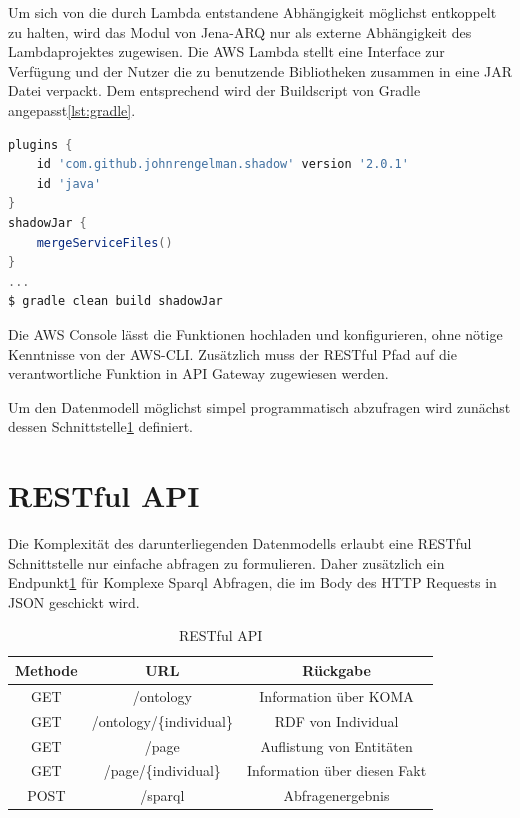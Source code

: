 \documentclass[
12pt,
english,
ngerman,
headsepline,
twoside,
openright,
numbers=noenddot,version=first
]{scrreprt}
\providecommand{\tabularnewline}{\\}
\begin{document}
Um sich von die durch Lambda entstandene Abhängigkeit möglichst entkoppelt\cite{FlowerRefactoring} zu halten, wird das Modul von Jena-ARQ nur als externe Abhängigkeit des Lambdaprojektes zugewisen.
Die AWS Lambda stellt eine Interface zur Verfügung und der Nutzer die zu benutzende Bibliotheken zusammen in eine JAR Datei verpackt. Dem entsprechend wird der Buildscript von Gradle\cite{Muschko2014} angepasst\ref{lst:gradle}. 

\begin{lstlisting}[language=Groovy,caption={Abhängigkeitenverwaltung für Lambda in Java},label={lst:gradle}]
plugins {
	id 'com.github.johnrengelman.shadow' version '2.0.1'
	id 'java'
}
shadowJar {
	mergeServiceFiles()
}
...
$ gradle clean build shadowJar
\end{lstlisting}

Die AWS Console lässt die Funktionen hochladen und konfigurieren, ohne nötige Kenntnisse von der AWS-CLI. Zusätzlich muss der RESTful Pfad auf die verantwortliche Funktion in API Gateway zugewiesen werden. 


Um den Datenmodell möglichst simpel programmatisch abzufragen wird zunächst dessen Schnittstelle\ref{sec:rest} definiert. 

\section{RESTful API}
\label{sec:rest}

Die Komplexität des darunterliegenden Datenmodells erlaubt eine RESTful\cite{Hunter2017} Schnittstelle nur einfache abfragen zu formulieren. Daher zusätzlich ein Endpunkt\ref{tab:rest} für Komplexe Sparql Abfragen, die im Body des HTTP Requests in JSON geschickt wird. 

\begin{table}[H]
	\caption{RESTful API}\label{tab:rest}
	\noindent 
	\centering{}
	\begin{tabular}{ccc}
		\hline
		\noalign{\vskip\doublerulesep}
		Methode & URL & Rückgabe\tabularnewline[\doublerulesep]
		\hline
		\noalign{\vskip\doublerulesep}
		GET & /ontology & Information über KOMA
		\tabularnewline[\doublerulesep]\noalign{\vskip\doublerulesep}
		\noalign{\vskip\doublerulesep}
		GET & /ontology/\{individual\} & RDF von Individual
		\tabularnewline[\doublerulesep]\noalign{\vskip\doublerulesep}
		GET & /page & Auflistung von Entitäten 
		\tabularnewline[\doublerulesep]\noalign{\vskip\doublerulesep}
		GET & /page/\{individual\} & Information über diesen Fakt
		\tabularnewline[\doublerulesep]\noalign{\vskip\doublerulesep}
		POST & /sparql & Abfragenergebnis
		
	\end{tabular}
\end{table}
\end{document}
